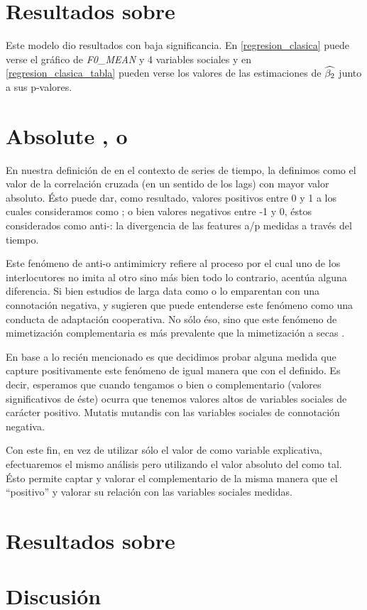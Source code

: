 \section{Resultados sobre \entrainment}

Este modelo dio resultados con baja significancia. En \ref{regresion_clasica} puede verse el gráfico de \emph{F0\_MEAN} y 4 variables sociales y en \ref{regresion_clasica_tabla} pueden verse los valores de las estimaciones de $\widehat{\beta_2}$ junto a sus p-valores.



\section{Absolute \entrainment, o \disentrainment}

En nuestra definición de \entrainment en el contexto de series de tiempo, la definimos como el valor de la correlación cruzada (en un sentido de los lags) con mayor valor absoluto. Ésto puede dar, como resultado, valores positivos entre 0 y 1 a los cuales consideramos como \entrainment; o bien valores negativos entre -1 y 0, éstos considerados como anti-\entrainment: la divergencia de las features a/p medidas a través del tiempo.

Este fenómeno de anti-\entrainment o antimimicry \cite{CHAR1999} refiere al proceso por el cual uno de los interlocutores no imita al otro sino más bien todo lo contrario, acentúa alguna diferencia. Si bien estudios de larga data como \cite{bourhis1973language} o \cite{dabbs1969similarity} lo emparentan con una connotación negativa, \cite{healey2014divergence} y \cite{levitan2015acoustic} sugieren que puede entenderse este fenómeno como una conducta de adaptación cooperativa. No sólo éso, sino que este fenómeno de mimetización complementaria es más prevalente que la mimetización a secas \cite{levitan2015acoustic}.

En base a lo recién mencionado es que decidimos probar alguna medida que capture positivamente este fenómeno de igual manera que con el \entrainment definido. Es decir, esperamos que cuando tengamos o bien \entrainment o \entrainment complementario (valores significativos de éste) ocurra que tenemos valores altos de variables sociales de carácter positivo. Mutatis mutandis con las variables sociales de connotación negativa.

Con este fin, en vez de utilizar sólo el valor de \entrainment como variable explicativa, efectuaremos el mismo análisis pero utilizando el valor absoluto del \entrainment como tal. Ésto permite captar y valorar el \entrainment complementario de la misma manera que el ``positivo'' y valorar su relación con las variables sociales medidas.

\section{Resultados sobre \absentrainment}


\section{Discusión}

